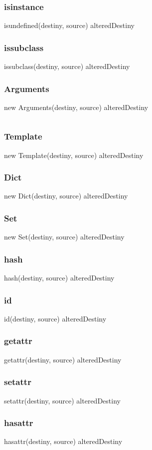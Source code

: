 \subsubsection*{isinstance}
isundefined(destiny, source) \rightarrow alteredDestiny
\subsubsection*{issubclass}
issubclass(destiny, source) \rightarrow alteredDestiny
\subsubsection*{Arguments}
new Arguments(destiny, source) \rightarrow alteredDestiny

\begin{lstlisting}[style=consola]
\end{lstlisting}

\subsubsection*{Template}
new Template(destiny, source) \rightarrow alteredDestiny
\subsubsection*{Dict}
new Dict(destiny, source) \rightarrow alteredDestiny
\subsubsection*{Set}
new Set(destiny, source) \rightarrow alteredDestiny
\subsubsection*{hash}
hash(destiny, source) \rightarrow alteredDestiny
\subsubsection*{id}
id(destiny, source) \rightarrow alteredDestiny
\subsubsection*{getattr}
getattr(destiny, source) \rightarrow alteredDestiny
\subsubsection*{setattr}
setattr(destiny, source) \rightarrow alteredDestiny
\subsubsection*{hasattr}
hasattr(destiny, source) \rightarrow alteredDestiny
